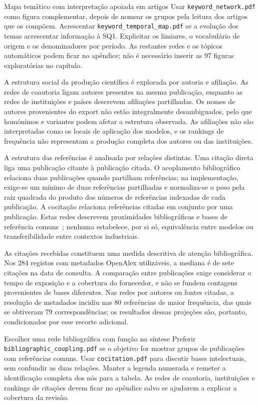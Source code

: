 {Mapa temático com interpretação apoiada em artigos}
{Usar \texttt{keyword\_network.pdf} como figura complementar,
depois de nomear os grupos pela leitura dos artigos que os
compõem. Acrescentar \texttt{keyword\_temporal\_map.pdf}
se a evolução dos temas acrescentar informação à SQ1. Explicitar
os limiares, o vocabulário de origem e os denominadores por período.
As restantes redes e os tópicos automáticos podem ficar no apêndice;
não é necessário inserir as 97 figuras exploratórias no capítulo.}%

A estrutura social da produção científica é explorada por autoria
e afiliação. As redes de coautoria ligam autores presentes na
mesma publicação, enquanto as redes de instituições e países
descrevem afiliações partilhadas. Os nomes de autores provenientes
do export não estão integralmente desambiguados, pelo que
homónimos e variantes podem afetar a estrutura observada. As
afiliações não são interpretadas como os locais de aplicação
dos modelos, e os rankings de frequência não representam a
produção completa dos autores ou das instituições.

A estrutura das referências é analisada por relações distintas.
Uma citação direta liga uma publicação citante à publicação citada.
O acoplamento bibliográfico relaciona duas publicações quando
partilham referências; na implementação, exige-se um mínimo de
duas referências partilhadas e normaliza-se o peso pela raiz
quadrada do produto dos números de referências indexadas de cada publicação. A cocitação
relaciona referências citadas em conjunto por uma publicação.
Estas redes descrevem proximidades bibliográficas e bases de
referência comuns~\cite{VanEck2010VOSviewer}; nenhuma estabelece,
por si só, equivalência entre modelos ou transferibilidade
entre contextos industriais.

As citações recebidas constituem uma medida descritiva de atenção
bibliográfica. Nos 284 registos com metadados OpenAlex utilizáveis,
a mediana é de sete citações na data de consulta. A comparação
entre publicações exige considerar o tempo de exposição e a
cobertura do fornecedor, e não se fundem contagens provenientes
de bases diferentes. Nas redes por autores ou fontes citadas,
a resolução de metadados incidiu nas 80 referências de maior
frequência, das quais se obtiveram 79 correspondências; os
resultados dessas projeções são, portanto, condicionados por
esse recorte adicional.

{Escolher uma rede bibliográfica com função na síntese}
{Preferir \texttt{bibliographic\_coupling.pdf} se o objetivo for
mostrar grupos de publicações com referências comuns. Usar
\texttt{cocitation.pdf} para discutir bases intelectuais, sem
confundir as duas relações. Manter a legenda numerada e remeter
a identificação completa dos nós para a tabela. As redes de
coautoria, instituições e rankings de citações devem ficar no
apêndice salvo se ajudarem a explicar a cobertura da revisão.}%

